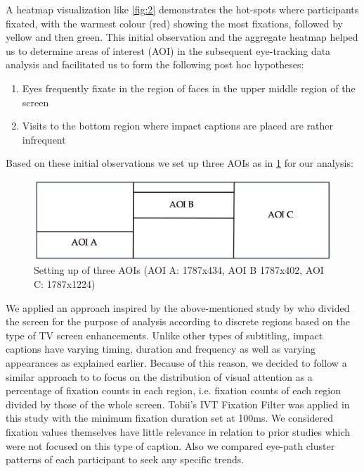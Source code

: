 \documentclass[output=paper]{langsci/langscibook}
\begin{document}
A heatmap visualization like \ref{fig:2} demonstrates the hot-spots where participants fixated, with the warmest colour (red) showing the most fixations, followed by yellow and then green. This initial observation and the aggregate heatmap helped us to determine areas of interest (AOI) in the subsequent eye-tracking data analysis and facilitated us to form the following post hoc hypotheses:

\begin{enumerate}
\item Eyes frequently fixate in the region of faces in the upper middle region of the screen
\item Visits to the bottom region where impact captions are placed are rather infrequent
\end{enumerate}

Based on these initial observations we set up three AOIs as in \ref{fig:3} for our analysis:

\begin{figure}
 \includegraphics[width=\textwidth]{figures/OHagan3.png}
	\caption{Setting up of three AOIs (AOI A: 1787x434, AOI B 1787x402, AOI C: 1787x1224)}
	\label{fig:3}
\end{figure}

We applied an approach inspired by the above-mentioned study by \citet{josephson2006} who divided the screen for the purpose of analysis according to discrete regions based on the type of TV screen enhancements. Unlike other types of subtitling, impact captions have varying timing, duration and frequency as well as varying appearances as explained earlier.  Because of this reason, we decided to follow a similar approach to \citet{josephson2006} to focus on the distribution of visual attention as a percentage of fixation counts in each region, i.e. fixation counts of each region divided by those of the whole screen.  Tobii's IVT Fixation Filter was applied in this study with the minimum fixation duration set at 100ms. We considered fixation values themselves have little relevance in relation to prior studies which were not focused on this type of caption. Also we compared eye-path cluster patterns of each participant to seek any specific trends.  
\end{document}

